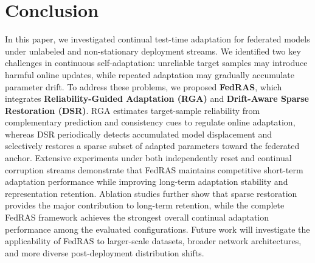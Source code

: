 \documentclass[journal]{IEEEtran}
\begin{document}
\section{Conclusion}
\label{sec:conclusion}

In this paper, we investigated continual test-time adaptation for federated models under unlabeled and non-stationary deployment streams. We identified two key challenges in continuous self-adaptation: unreliable target samples may introduce harmful online updates, while repeated adaptation may gradually accumulate parameter drift. To address these problems, we proposed \textbf{FedRAS}, which integrates \textbf{Reliability-Guided Adaptation (RGA)} and \textbf{Drift-Aware Sparse Restoration (DSR)}. RGA estimates target-sample reliability from complementary prediction and consistency cues to regulate online adaptation, whereas DSR periodically detects accumulated model displacement and selectively restores a sparse subset of adapted parameters toward the federated anchor. Extensive experiments under both independently reset and continual corruption streams demonstrate that FedRAS maintains competitive short-term adaptation performance while improving long-term adaptation stability and representation retention. Ablation studies further show that sparse restoration provides the major contribution to long-term retention, while the complete FedRAS framework achieves the strongest overall continual adaptation performance among the evaluated configurations. Future work will investigate the applicability of FedRAS to larger-scale datasets, broader network architectures, and more diverse post-deployment distribution shifts.
\end{document}
